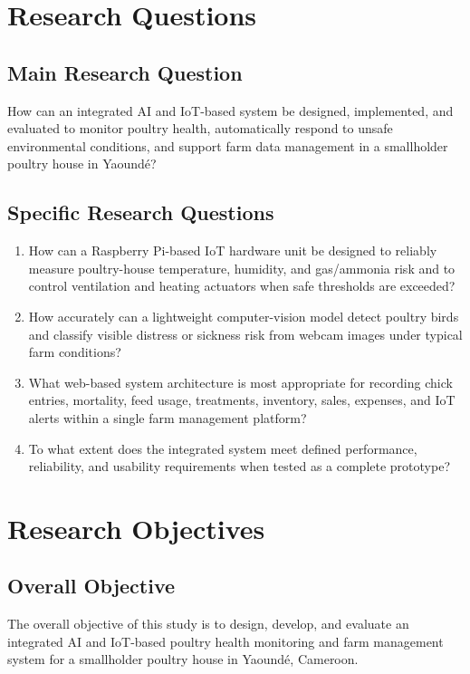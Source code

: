 \documentclass[12pt,a4paper]{report}
\begin{document}
\section{Research Questions}

\subsection{Main Research Question}

How can an integrated AI and IoT-based system be designed, implemented, and evaluated to monitor poultry health, automatically respond to unsafe environmental conditions, and support farm data management in a smallholder poultry house in Yaound\'e?

\subsection{Specific Research Questions}

\begin{enumerate}[label=\arabic*., leftmargin=1.5cm]
 \item How can a Raspberry Pi-based IoT hardware unit be designed to reliably measure poultry-house temperature, humidity, and gas/ammonia risk and to control ventilation and heating actuators when safe thresholds are exceeded?
 \item How accurately can a lightweight computer-vision model detect poultry birds and classify visible distress or sickness risk from webcam images under typical farm conditions?
 \item What web-based system architecture is most appropriate for recording chick entries, mortality, feed usage, treatments, inventory, sales, expenses, and IoT alerts within a single farm management platform?
 \item To what extent does the integrated system meet defined performance, reliability, and usability requirements when tested as a complete prototype?
\end{enumerate}

\section{Research Objectives}

\subsection{Overall Objective}

The overall objective of this study is to design, develop, and evaluate an integrated AI and IoT-based poultry health monitoring and farm management system for a smallholder poultry house in Yaound\'e, Cameroon.
\end{document}
